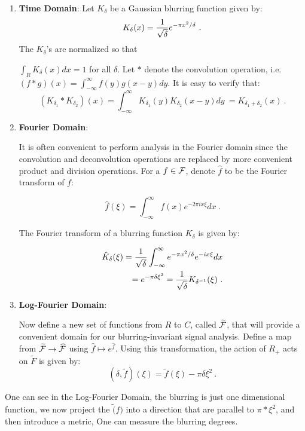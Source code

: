 \documentclass[11pt] {article}
\begin{document}
\begin{enumerate}
\item {\bf Time Domain}:
Let $K_{\delta}$ be a Gaussian blurring function given by: 
$$
K_{\delta}(x) = {1 \over \sqrt{\delta}}e^{-\pi x^2/\delta}\ .
$$
The $K_{\delta}$'s are normalized so that

$\int_R K_{\delta}(x) dx = 1$ for all $\delta$.
Let $*$ denote the convolution operation, i.e. \\
$(f*g)(x) = \int_{-\infty}^{\infty} f(y) g(x-y) dy$.
It is easy to verify that:
$$
(K_{\delta_1}*K_{\delta_2})(x) = \int_{-\infty}^{\infty} K_{\delta_1}(y) K_{\delta_2}(x-y) dy\  = K_{\delta_1 + \delta_2}(x)\ .
$$

\item {\bf Fourier Domain}:

It is often convenient to perform analysis in the Fourier domain since the convolution and 
deconvolution operations are replaced by more convenient product and division operations. 
For a $f \in {\cal F}$, denote $\hat{f}$ to be the Fourier
transform of $f$: 

$$
\hat{f}(\xi) = \int_{-\infty}^{\infty} f(x) e^{-2\pi i x \xi} dx\ .
$$

The Fourier transform of a blurring function $K_{\delta}$ is given by:

\begin{equation}
\begin{split}
\hat{K}_{\delta}(\xi) =  {1 \over \sqrt{\delta}} \int_{-\infty}^{\infty} e^{-\pi x^2/\delta}  e^{-i x \xi} dx \\
=   e^{-\pi \delta \xi^2} = {1 \over \sqrt{\delta}} K_{{\delta}^{-1}}(\xi)\ .
\end{split}
\end{equation}


\item {\bf Log-Fourier Domain}: 

Now define a new set of functions from $R$ to $C$, called
 $\widetilde{\cal F}$,  that will provide a convenient domain for our blurring-invariant signal analysis. 
 Define a map from $\widetilde{\cal F} \to \widehat{\cal F}$ using $\hat{f} \mapsto e^{\hat{f}}$. 
 Using this transformation, the action of  $R_+$ acts on $\tilde{F}$ is given by: 
 $$
 (\delta, \tilde{f})(\xi) = \tilde{f}(\xi) - \pi \delta \xi^2\ .
 $$

\end {enumerate}

One can see in the Log-Fourier Domain, the blurring is just one dimensional function, we now project the $\tilde(f)$ into a 
direction that are parallel to $\pi*\xi^2$, and then introduce a metric, One can measure the blurring degrees. 
 
\end{document}
